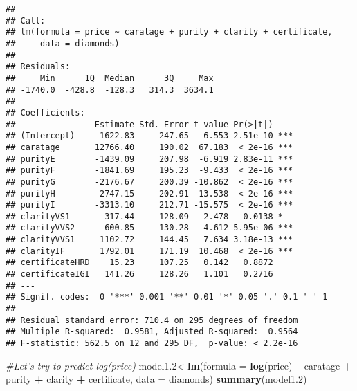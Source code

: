 \documentclass[]{article}
\newenvironment{Shaded}{\begin{snugshade}}{\end{snugshade}}
\newcommand{\KeywordTok}[1]{\textcolor[rgb]{0.13,0.29,0.53}{\textbf{#1}}}
\newcommand{\DataTypeTok}[1]{\textcolor[rgb]{0.13,0.29,0.53}{#1}}
\newcommand{\DecValTok}[1]{\textcolor[rgb]{0.00,0.00,0.81}{#1}}
\newcommand{\StringTok}[1]{\textcolor[rgb]{0.31,0.60,0.02}{#1}}
\newcommand{\CommentTok}[1]{\textcolor[rgb]{0.56,0.35,0.01}{\textit{#1}}}
\newcommand{\OperatorTok}[1]{\textcolor[rgb]{0.81,0.36,0.00}{\textbf{#1}}}
\newcommand{\NormalTok}[1]{#1}
\begin{document}
\begin{verbatim}
## 
## Call:
## lm(formula = price ~ caratage + purity + clarity + certificate, 
##     data = diamonds)
## 
## Residuals:
##     Min      1Q  Median      3Q     Max 
## -1740.0  -428.8  -128.3   314.3  3634.1 
## 
## Coefficients:
##                Estimate Std. Error t value Pr(>|t|)    
## (Intercept)    -1622.83     247.65  -6.553 2.51e-10 ***
## caratage       12766.40     190.02  67.183  < 2e-16 ***
## purityE        -1439.09     207.98  -6.919 2.83e-11 ***
## purityF        -1841.69     195.23  -9.433  < 2e-16 ***
## purityG        -2176.67     200.39 -10.862  < 2e-16 ***
## purityH        -2747.15     202.91 -13.538  < 2e-16 ***
## purityI        -3313.10     212.71 -15.575  < 2e-16 ***
## clarityVS1       317.44     128.09   2.478   0.0138 *  
## clarityVVS2      600.85     130.28   4.612 5.95e-06 ***
## clarityVVS1     1102.72     144.45   7.634 3.18e-13 ***
## clarityIF       1792.01     171.19  10.468  < 2e-16 ***
## certificateHRD    15.23     107.25   0.142   0.8872    
## certificateIGI   141.26     128.26   1.101   0.2716    
## ---
## Signif. codes:  0 '***' 0.001 '**' 0.01 '*' 0.05 '.' 0.1 ' ' 1
## 
## Residual standard error: 710.4 on 295 degrees of freedom
## Multiple R-squared:  0.9581, Adjusted R-squared:  0.9564 
## F-statistic: 562.5 on 12 and 295 DF,  p-value: < 2.2e-16
\end{verbatim}

\begin{Shaded}
\begin{Highlighting}[]
\CommentTok{#Let's try to predict log(price)}
\NormalTok{model1.}\DecValTok{2}\NormalTok{<-}\KeywordTok{lm}\NormalTok{(}\DataTypeTok{formula =} \KeywordTok{log}\NormalTok{(price) }\OperatorTok{~}\StringTok{ }\NormalTok{caratage }\OperatorTok{+}\StringTok{ }\NormalTok{purity }\OperatorTok{+}\StringTok{ }\NormalTok{clarity }\OperatorTok{+}\StringTok{ }\NormalTok{certificate, }\DataTypeTok{data =}\NormalTok{ diamonds)}
\KeywordTok{summary}\NormalTok{(model1.}\DecValTok{2}\NormalTok{)}
\end{Highlighting}
\end{Shaded}
\end{document}
